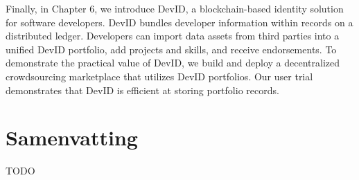 Finally, in Chapter 6, we introduce DevID, a blockchain-based identity solution for software developers.
DevID bundles developer information within records on a distributed ledger.
Developers can import data assets from third parties into a unified DevID portfolio, add projects and skills, and receive endorsements.
To demonstrate the practical value of DevID, we build and deploy a decentralized crowdsourcing marketplace that utilizes DevID portfolios.
Our user trial demonstrates that DevID is efficient at storing portfolio records.

\chapter*{Samenvatting}

{

TODO
}



